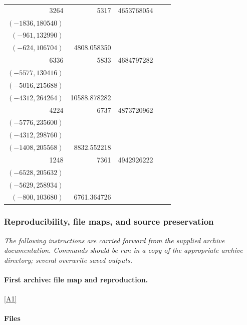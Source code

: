 \documentclass[11pt]{article}
\newcommand{\srcref}[1]{\hyperlink{source:#1}{[#1]}}
\begin{document}
\begin{longtable}{r r r l r}
3264 & 5317 & 4653768054 & \begin{tabular}[t]{@{}l@{}}$(-5200,71760)$\\$(-1836,180540)$\\$(-961,132990)$\\$(-624,106704)$\end{tabular} & 4808.058350\\[5pt]
6336 & 5833 & 4684797282 & \begin{tabular}[t]{@{}l@{}}$(-5832,8424)$\\$(-5577,130416)$\\$(-5016,215688)$\\$(-4312,264264)$\end{tabular} & 10588.878282\\[5pt]
4224 & 6737 & 4873720962 & \begin{tabular}[t]{@{}l@{}}$(-6728,25752)$\\$(-5776,235600)$\\$(-4312,298760)$\\$(-1408,205568)$\end{tabular} & 8832.552218\\[5pt]
1248 & 7361 & 4942926222 & \begin{tabular}[t]{@{}l@{}}$(-6877,164450)$\\$(-6528,205632)$\\$(-5629,258934)$\\$(-800,103680)$\end{tabular} & 6761.364726\\[5pt]
\end{longtable}
\endgroup

\subsubsection{Reproducibility, file maps, and source preservation}\label{reproduction}
\textit{The following instructions are carried forward from the supplied archive documentation. Commands should be run in a copy of the appropriate archive directory; several overwrite saved outputs.}

\paragraph{First archive: file map and reproduction.}\srcref{A1}
\paragraph{Files}
\end{document}
